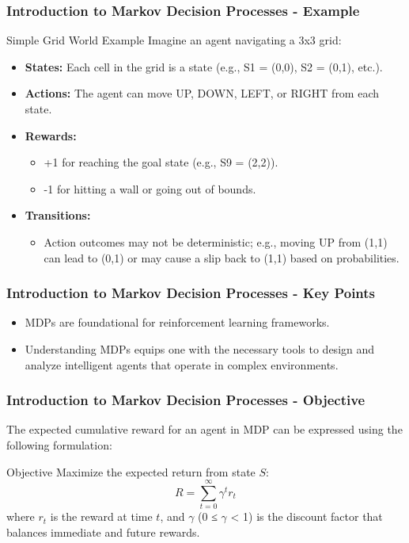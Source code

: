 \documentclass{beamer}
\begin{document}
\begin{frame}[fragile]
    \frametitle{Introduction to Markov Decision Processes - Example}
    \begin{block}{Simple Grid World Example}
        Imagine an agent navigating a 3x3 grid:
        \begin{itemize}
            \item \textbf{States:} Each cell in the grid is a state (e.g., S1 = (0,0), S2 = (0,1), etc.).
            \item \textbf{Actions:} The agent can move UP, DOWN, LEFT, or RIGHT from each state.
            \item \textbf{Rewards:} 
                \begin{itemize}
                    \item +1 for reaching the goal state (e.g., S9 = (2,2)).
                    \item -1 for hitting a wall or going out of bounds.
                \end{itemize}
            \item \textbf{Transitions:} 
                \begin{itemize}
                    \item Action outcomes may not be deterministic; e.g., moving UP from (1,1) can lead to (0,1) or may cause a slip back to (1,1) based on probabilities.
                \end{itemize}
        \end{itemize}
    \end{block}
\end{frame}

\begin{frame}[fragile]
    \frametitle{Introduction to Markov Decision Processes - Key Points}
    \begin{itemize}
        \item MDPs are foundational for reinforcement learning frameworks.
        \item Understanding MDPs equips one with the necessary tools to design and analyze intelligent agents that operate in complex environments.
    \end{itemize}
\end{frame}

\begin{frame}[fragile]
    \frametitle{Introduction to Markov Decision Processes - Objective}
    The expected cumulative reward for an agent in MDP can be expressed using the following formulation:

    \begin{block}{Objective}
        Maximize the expected return from state $ S $:
        \begin{equation}
            R = \sum_{t=0}^{\infty} \gamma^t r_t
        \end{equation}
        where $ r_t $ is the reward at time $ t $, and $ \gamma $ (0 ≤ $ \gamma $ < 1) is the discount factor that balances immediate and future rewards.
    \end{block}
\end{frame}
\end{document}
